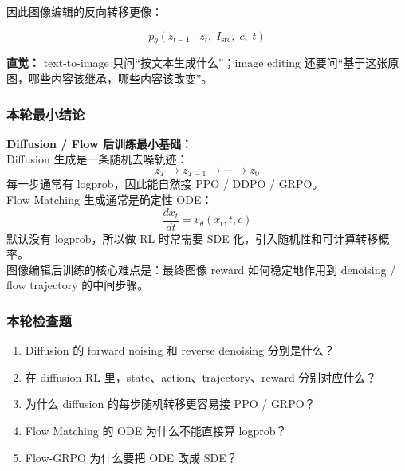 因此图像编辑的反向转移更像：

\[
p_\theta(z_{t-1}
\mid
z_t,\;
I_\text{src},\;
c,\;
t)
\]

\begin{intubox}
\textbf{直觉：} text-to-image 只问“按文本生成什么”；image editing 还要问“基于这张原图，哪些内容该继承，哪些内容该改变”。
\end{intubox}

\subsubsection{本轮最小结论}

\begin{summarybox}
\textbf{Diffusion / Flow 后训练最小基础：}\\
Diffusion 生成是一条随机去噪轨迹：
\[
z_T\to z_{T-1}\to\cdots\to z_0
\]
每一步通常有 logprob，因此能自然接 PPO / DDPO / GRPO。\\
Flow Matching 生成通常是确定性 ODE：
\[
\frac{dx_t}{dt}=v_\theta(x_t,t,c)
\]
默认没有 logprob，所以做 RL 时常需要 SDE 化，引入随机性和可计算转移概率。\\
图像编辑后训练的核心难点是：最终图像 reward 如何稳定地作用到 denoising / flow trajectory 的中间步骤。
\end{summarybox}

\subsubsection{本轮检查题}

\begin{enumerate}[leftmargin=1.5em]
  \item Diffusion 的 forward noising 和 reverse denoising 分别是什么？
  \item 在 diffusion RL 里，state、action、trajectory、reward 分别对应什么？
  \item 为什么 diffusion 的每步随机转移更容易接 PPO / GRPO？
  \item Flow Matching 的 ODE 为什么不能直接算 logprob？
  \item Flow-GRPO 为什么要把 ODE 改成 SDE？
\end{enumerate}
